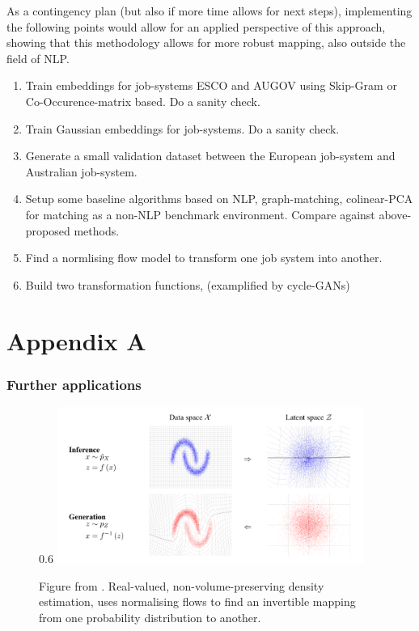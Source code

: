 \documentclass{NSF}
\begin{document}
As a contingency plan (but also if more time allows for next steps), implementing the following points would allow for an applied perspective of this approach, showing that this methodology allows for more robust mapping, also outside the field of NLP.

\begin{enumerate}
    \item Train embeddings for job-systems ESCO and AUGOV using Skip-Gram or Co-Occurence-matrix based. Do a sanity check.
    \item Train Gaussian embeddings for job-systems. Do a sanity check.
    \item Generate a small validation dataset between the European job-system and Australian job-system.
    \item Setup some baseline algorithms based on NLP, graph-matching, colinear-PCA for matching as a non-NLP benchmark environment. Compare against above-proposed methods.
    \item Find a normlising flow model to transform one job system into another.
    \item Build two transformation functions, (examplified by cycle-GANs)
\end{enumerate}


\renewcommand\refname{References}



\newpage
\section{Appendix A}

\subsubsection{Further applications}

\begin{figure}[hb]{0.6\textwidth}
  \centering
  \includegraphics[width=10cm]{NVP.png}
  \caption{Figure from \cite{nvp}. Real-valued, non-volume-preserving density estimation, uses normalising flows to find an invertible mapping from one probability distribution to another.}
  \label{fig:test}
\end{figure}
\end{document}
